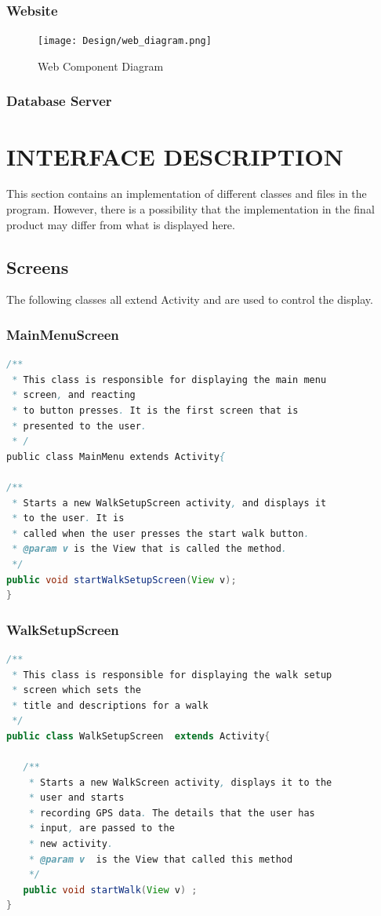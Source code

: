 \documentclass[12pt]{article}
\begin{document}
\subsubsection{Website}
\clearpage
\begin{figure}[htp]

\centering
\texttt{[image: Design/web\_diagram.png]}
\caption{Web Component Diagram}
\label{Web Component Diagram}
\end{figure}
\subsubsection{Database Server}
\section{INTERFACE DESCRIPTION}
This section contains an implementation of different classes and files in the program. However, there is a possibility that the implementation in the final product may differ from what is displayed here.
\subsection{Screens}
The following classes all extend Activity and are used to control the display.

\subsubsection{MainMenuScreen}
\begin{lstlisting}[language=java]
/**
 * This class is responsible for displaying the main menu 
 * screen, and reacting
 * to button presses. It is the first screen that is 
 * presented to the user.
 * /
public class MainMenu extends Activity{

/**
 * Starts a new WalkSetupScreen activity, and displays it
 * to the user. It is
 * called when the user presses the start walk button.
 * @param v is the View that is called the method.
 */
public void startWalkSetupScreen(View v);
}
\end{lstlisting}
\subsubsection{WalkSetupScreen}
\begin{lstlisting}[language=java]
/**
 * This class is responsible for displaying the walk setup
 * screen which sets the
 * title and descriptions for a walk
 */
public class WalkSetupScreen  extends Activity{

   /**
    * Starts a new WalkScreen activity, displays it to the 
    * user and starts
    * recording GPS data. The details that the user has 
    * input, are passed to the
    * new activity.
    * @param v  is the View that called this method
    */
   public void startWalk(View v) ;
}
\end{lstlisting}
\end{document}
